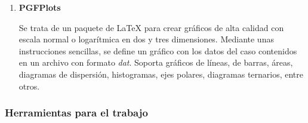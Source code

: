 \begin{enumerate}
Estas librerías se reunen en el paquete de \textbf{PyFoam} \cite{pyfoam}, desarrolladas
para controlar las simulaciones de OpenFoam con script decentes para
realizar variaciones de parámetros o analizar resultados.

Referencias de interés para conocer más sobre el lenguaje:

\begin{itemize}
\item
  Training\footnote{\url{http://www.learnpython.org/es/}}.
\item
  ``Happy
Foaming with Python''\footnote{\url{https://openfoamwiki.net/images/d/de/HappyFoamingWithPyFoam.pdf}}.
\item
``Automatization
with pyFoam''\footnote{\url{http://web.student.chalmers.se/groups/ofw5/Advanced_Training/pyFoamAdvanced.pdf}}.
\end{itemize}

\item
  \textbf{PGFPlots} \cite{pgfplots}

Se trata de un paquete de LaTeX para crear gráficos de alta calidad con
escala normal o logarítmica en dos y tres dimensiones. Mediante unas
instrucciones sencillas, se define un gráfico con los datos del caso
contenidos en un archivo con formato \emph{dat}. Soporta gráficos de
líneas, de barras, áreas, diagramas de dispersión, histogramas, ejes
polares, diagramas ternarios, entre otros.
\end{enumerate}

\subsubsection{Herramientas para el trabajo}\label{header-n366}

